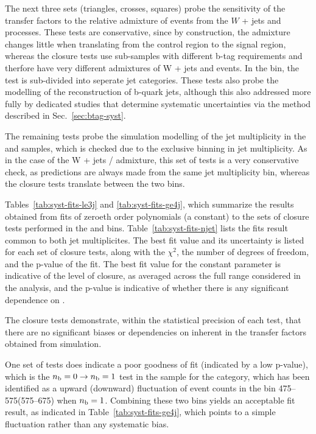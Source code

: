 The next three sets (triangles, crosses, squares) probe the
sensitivity of the transfer factors to the relative admixture of
events from the $W$ + jets and \ttbar processes. These tests are
conservative, since by construction, the admixture changes little when
translating from the \mj control region to the signal region, whereas the 
closure tests use sub-samples with different b-tag requirements and 
therfore have very different admixtures of W + jets and \ttbar events.  
In the \njetlow bin, the test is sub-divided into seperate jet categories.
These tests also probe the modelling of the reconstruction of b-quark jets, 
although this also addressed more fully by dedicated studies that 
determine systematic uncertainties via the method described in
Sec.~\ref{sec:btag-syst}.

The remaining tests probe the simulation modelling of
the jet multiplicity in the \mj and \gj samples, which is checked due 
to the exclusive binning in jet multiplicity. As in the case of the 
W + jets / \ttbar admixture, this set of tests  is a very conservative
 check, as predictions are always made from the same jet multiplicity bin,
whereas the closure tests translate between the two bins.

Tables~\ref{tab:syst-fits-le3j} and \ref{tab:syst-fits-ge4j}, which
summarize the results obtained from fits of zeroeth order polynomials
(\ie a constant) to the sets of closure tests performed in the \njetlow 
and \njethigh bins.  Table~\ref{tab:syst-fits-njet} lists the fits result
common to both jet multiplicites. The best fit value and its uncertainty
is listed for each set of closure tests, along with the $\chi^{2}$, the number
of degrees of freedom, and the p-value of the fit. The best fit value
for the constant parameter is indicative of the level of closure, as
averaged across the full \scalht range considered in the analysis, and
the p-value is indicative of whether there is any significant
dependence on \scalht. 

The closure tests demonstrate, within the statistical precision 
of each test, that there are no significant biases or dependencies on 
\scalht inherent in the transfer factors obtained from simulation.  

One set of tests does indicate a poor goodness of fit (indicated by a
low p-value), which is the $n_{\text{b}} = 0 \rightarrow n_{\text{b}} = 1$ test in the \mj
sample for the \njethigh category, which has been identified as a
upward (downward) fluctuation of event counts in the \scalht bin
475--575\gev (575--675\gev) when $n_{\text{b}} = 1$. Combining these two bins
yields an acceptable fit result, as indicated in
Table~\ref{tab:syst-fits-ge4j}, which points to a simple fluctuation
rather than any systematic bias.

